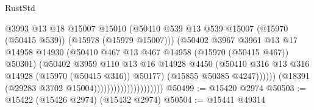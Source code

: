 \begin{lexlean}{RustStd}
\begin{coremodule}
                                                @3993
                                                @13
                                                @18
                                                @15007
                                                @15010
                                                (@50410
                                                  @539
                                                  @13
                                                  @539
                                                  @15007
                                                  (@15970 (@50415 @539))
                                                  (@15978 (@15979 @15007)))
                                                (@50402
                                                  @3967
                                                  @3961
                                                  @13
                                                  @17
                                                  @14958
                                                  @14930
                                                  (@50410
                                                    @467
                                                    @13
                                                    @467
                                                    @14958
                                                    (@15970 (@50415 @467))
                                                    @50301)
                                                  (@50402
                                                    @3959
                                                    @110
                                                    @13
                                                    @16
                                                    @14928
                                                    @4450
                                                    (@50410
                                                      @316
                                                      @13
                                                      @316
                                                      @14928
                                                      (@15970 (@50415 @316))
                                                      @50177)
                                                    (@15855 @50385 @4247))))))
                                          (@18391 (@29283 @3702 @15004)))))))))))))))))))))
@50499 := @15420 @2974
@50503 := @15422 (@15426 @2974) (@15432 @2974)
@50504 := @15441 @49314

\end{coremodule}
\end{lexlean}
